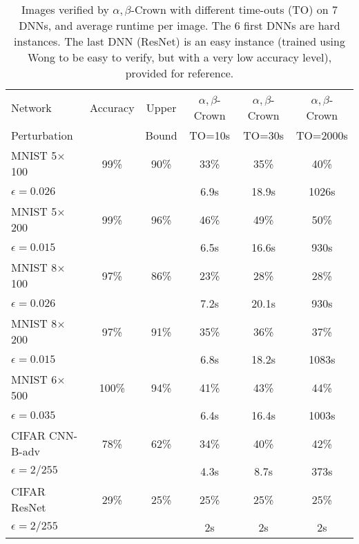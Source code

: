 \begin{table}[t!]
	\centering
	\begin{tabular}{||l|c|c||c|c|c||}
		\hline
		Network & Accuracy & Upper  & $\alpha,\beta$-Crown& $\alpha,\beta$-Crown & $\alpha,\beta$-Crown \\ 
		Perturbation &   & Bound & TO=10s & TO=30s & TO=2000s\\ \hline
		MNIST 5$\times$100 & 99\% & 90\% & 33\% & 35\% & 40\%   \\
		$\epsilon = 0.026$ &  &  & 6.9s &  18.9s &  1026s  \\  \hline
		MNIST 5$\times$200 & 99\%  & 96\%  & 46\%  & 49\%  & 50\%   \\ 
		$\epsilon = 0.015$ & &  & 6.5s &  16.6s &  930s  \\  \hline
		MNIST 8$\times$100 & 97\%  & 86\%  & 23\%  & 28\%  & 28\%   \\
		$\epsilon = 0.026$ &  &  & 7.2s &  20.1s &  930s  \\  \hline
		MNIST 8$\times$200 & 97\%  & 91\%  & 35\%  & 36\%  & 37\%   \\ 
		$\epsilon = 0.015$ & &  & 6.8s &  18.2s &  1083s  \\  \hline
		MNIST 6$\times$500 & 100\%  & 94\%  & 41\%  & 43\%  & 44\%   \\ 
		$\epsilon = 0.035$ & &  & 6.4s &  16.4s &  1003s  \\  \hline
		CIFAR CNN-B-adv & 78\%  & 62\%  &  34\% & 40\%  & 42\%   \\
		$\epsilon = 2/255$&  &  & 4.3s & 8.7s & 373s  \\ \hline \hline
		CIFAR ResNet & 29\%  & 25\%  & 25\%  & 25\%  & 25\%   \\
		$\epsilon = 2/255$ &  &  & 2s & 2s & 2s  \\ \hline
	\end{tabular}
	\caption{Images verified by $\alpha,\beta$-Crown with different time-outs (TO) on 7 DNNs, and average runtime per image. The 6 first DNNs are hard instances. The last DNN (ResNet) is an easy instance (trained using Wong to be easy to verify, but with a very low accuracy level), provided for reference.}
	\label{table_beta}
	\vspace{-0.3cm}
\end{table}



